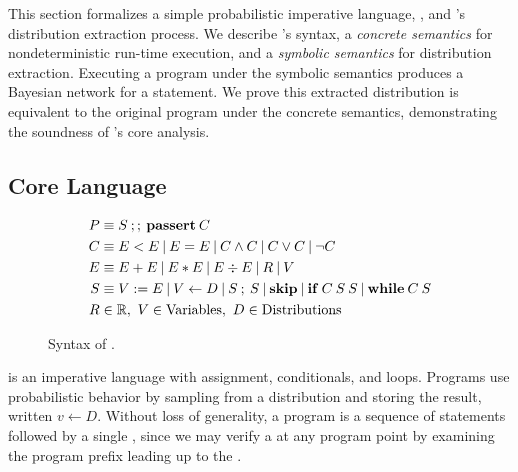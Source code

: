 \newcommand{\ifexpanded}[2]{\if{} #1 \else #2 \fi}
\ifexpanded{}{\excludecomment{expandedonly}}
\ifexpanded{}{}

\newenvironment{semantics}{
\begin{figure}[p]
}{
\end{figure}
}

This section formalizes a simple probabilistic imperative
language, \corelang,
and \tool's distribution
extraction process. %
We describe \corelang's 
syntax, a \emph{concrete semantics} for nondeterministic
run-time execution, and a \emph{symbolic semantics} for
distribution extraction. Executing a \corelang program under the
symbolic semantics produces a Bayesian network for a \passert statement. We
prove this extracted distribution is equivalent to the original program under
the concrete semantics, demonstrating the soundness of \tool's core analysis.

\subsection{Core Language}

\begin{figure}
    \begin{align*}
        P &\equiv S\:;;\:\mathbf{passert}\:C \\
        C &\equiv E < E \:|\: E = E \:|\: C \wedge C \:|\: C \vee C \:|\: \neg C \\
        E &\equiv E + E \:|\: E * E \:|\: E \div E \:|\: R \:|\: V \\
        S &\equiv V := E \:|\: V \leftarrow D \:|\: S\:;\:S \:|\: \mathbf{skip} \:|\:
        \mathbf{if}\:C\:S\:S \:|\: \mathbf{while}\:C\:S \\
        R &\in \mathbb{R}, 
        ~V \in \mathrm{Variables}, 
        ~D \in \mathrm{Distributions} \\
    \end{align*}
    \vspace{-5ex}
    \caption{Syntax of \corelang.}
    \label{fig:syntax}
\end{figure}

\corelang is an imperative language with assignment, conditionals,
and loops. Programs use probabilistic behavior by sampling from a
distribution and storing the result, written $v \leftarrow D$.
Without loss of generality, a program is a sequence of statements followed by a
single \passert, since we may verify a \passert at any program point
by examining the program prefix leading up to the \passert.

